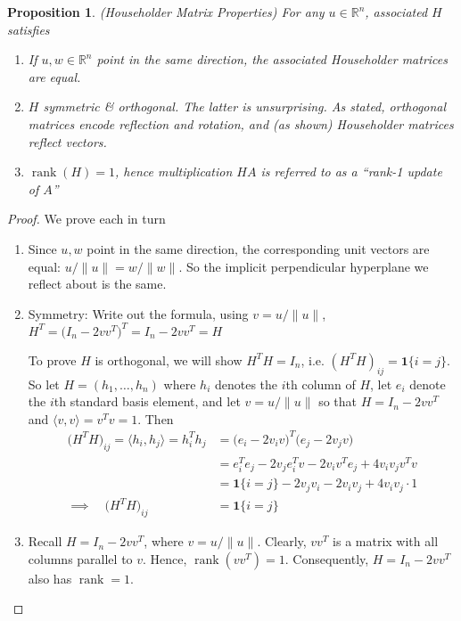 \documentclass[12pt]{book}
\numberwithin{equation}{section} %
\theoremstyle{plain}
\newtheorem{prop}[thm]{Proposition}
\theoremstyle{definition}
\theoremstyle{remark}
\newcommand{\Rn}{\mathbb{R}^n}
\newcommand{\rank}{\operatorname{rank}}
\begin{document}
\begin{prop}\emph{(Householder Matrix Properties)}
For any $u\in\Rn$, associated $H$ satisfies
\begin{enumerate}[label=\emph{(\roman*)}]
    \item If $u,w\in\Rn$ point in the same direction, the associated
      Householder matrices are equal.
  \item $H$ symmetric \& orthogonal.
    The latter is unsurprising. As stated, orthogonal matrices
    encode reflection and rotation, and (as shown) Householder matrices
    reflect vectors.
  \item $\rank(H)=1$, hence multiplication $HA$ is referred to as a
    \emph{``rank-1 update of $A$''}
\end{enumerate}
\end{prop}
\begin{proof}
We prove each in turn
\begin{enumerate}[label=(\roman*)]
  \item
    Since $u,w$ point in the same direction, the corresponding unit
    vectors are equal: $u/\lVert u\rVert=w/\lVert w\rVert$.  So the
    implicit perpendicular hyperplane we reflect about is the same.
  \item
    Symmetry:
    Write out the formula, using $v=u/\lVert u\rVert$,
      $H^T
      = \big(I_n- 2vv^T\big)^T
      = I_n - 2vv^T = H$

    To prove $H$ is orthogonal, we will show $H^TH=I_n$, i.e.
    $(H^TH)_{ij}=\mathbf{1}\{i=j\}$.
    So let $H=(h_1,\ldots,h_n)$ where $h_i$ denotes the $i$th column of
    $H$, let $e_i$ denote the $i$th standard basis element, and let
    $v=u/\lVert u\rVert$ so that $H=I_n-2vv^T$ and
    $\langle v,v\rangle=v^Tv=1$. Then
    \begin{align*}
      \big(H^TH\big)_{ij}
      =
      \langle h_i, h_j\rangle
      = h_i^Th_j
      &=
      \big(e_i - 2v_iv\big)^T
      \big(e_j - 2v_jv\big)
      \\
      &=
      e_i^Te_j - 2v_je_i^T v
      - 2v_i v^Te_j + 4v_iv_j v^Tv
      \\
      &=
      \mathbf{1}\{i=j\}
      - 2v_jv_i
      - 2v_iv_j + 4v_iv_j\cdot 1
      \\
      \implies\quad
      \big(H^TH\big)_{ij}
      &=
      \mathbf{1}\{i=j\}
    \end{align*}

  \item
    Recall $H=I_n-2vv^T$, where $v=u/\lVert u\rVert$.
    Clearly, $vv^T$ is a matrix with all columns parallel to $v$. Hence,
    $\rank(vv^T)=1$. Consequently, $H=I_n-2vv^T$ also has $\rank=1$.
\end{enumerate}
\end{proof}
\end{document}
